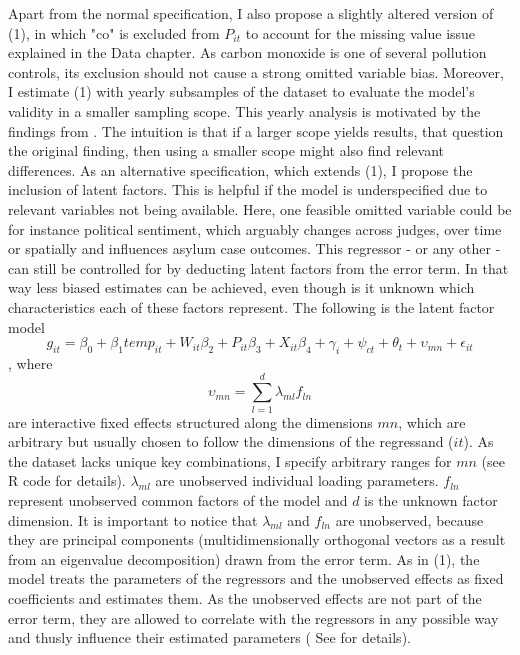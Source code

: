 \documentclass[11pt]{article}
\begin{document}
	\newline Apart from the normal specification, I also propose a slightly altered version of (1), in which "co" is excluded from \(P_{it}\) to account for the missing value issue explained in the Data chapter. As carbon monoxide is one of several pollution controls, its exclusion should not cause a strong omitted variable bias. Moreover, I estimate (1) with yearly subsamples of the dataset to evaluate the model's validity in a smaller sampling scope. This yearly analysis is motivated by the findings from \cite{Spamann.2020}. The intuition is that if a larger scope yields  results, that question the original finding, then using a smaller scope might also find relevant differences.
	\newline As an alternative specification, which extends (1), I propose the inclusion of latent factors. This is helpful if the model is underspecified due to relevant variables not being available. Here, one feasible omitted variable could be for instance political sentiment, which arguably changes across judges, over time or spatially and influences asylum case outcomes. This regressor - or any other - can still be controlled for by deducting latent factors from the error term. In that way less biased estimates can be achieved, even though is it unknown which characteristics each of these factors represent. The following is the latent factor model
	\begin{equation}
		g_{ it } = \beta_{0} + \beta_{1 }temp_{it} + W_{it}\beta_{2} + P_{it}\beta_{3} + X_{it}\beta_{4} + \gamma_{i} + \psi_{ct} + \theta_{t} + \upsilon_{mn} + \epsilon_{it}
	\end{equation}
	, where 
	\begin{equation}
		\upsilon_{mn} = \sum_{l=1}^d \lambda_{ ml } f_{ ln }
	\end{equation}
	are interactive fixed effects structured along the dimensions \(mn\), which are arbitrary but  usually chosen to follow the dimensions of the regressand (\(it\)). As the dataset lacks unique key combinations, I specify arbitrary ranges for \(mn\) (see R code for details). \(\lambda_{ ml }\) are unobserved individual loading parameters. \(f_{ ln }\) represent unobserved common factors of the model and  \(d\) is the unknown factor dimension. It is important to notice that  \(\lambda_{ ml }\) and \(f_{ ln }\) are  unobserved, because they are principal components (multidimensionally orthogonal vectors as a result from an eigenvalue decomposition) drawn from the error term. As  in (1), the model treats the parameters of the regressors and the unobserved effects as fixed coefficients and estimates them. As the unobserved effects are not part of the error term, they are allowed to correlate with the regressors in any possible way and thusly influence their estimated parameters ( See \cite{bai2009panel} for details).
\end{document}
